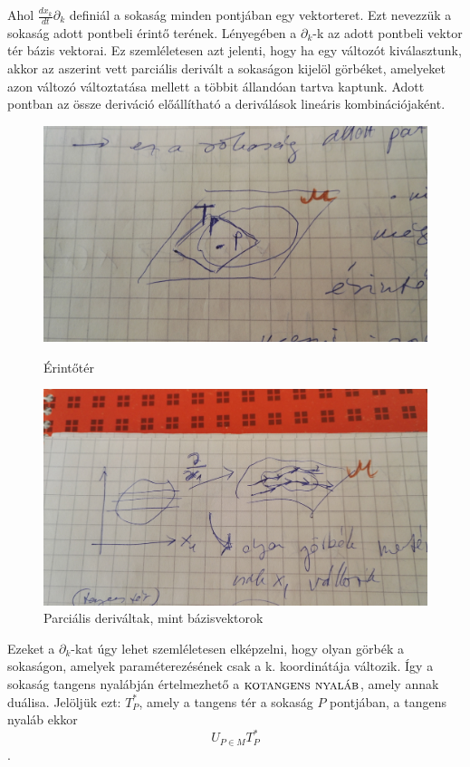 \documentclass[a4paper, 12pt]{article}
\begin{document}
\par Ahol $\frac{dx_{k}}{dt}\partial_{k}$ definiál a sokaság minden pontjában egy vektorteret. Ezt nevezzük a sokaság adott pontbeli érintő terének. Lényegében a $\partial_{k}$-k az adott pontbeli vektor tér bázis vektorai. Ez szemléletesen azt jelenti, hogy ha egy változót kiválasztunk, akkor az aszerint vett parciális derivált a sokaságon kijelöl görbéket, amelyeket azon változó változtatása mellett a többit állandóan tartva kaptunk. Adott pontban az össze deriváció előállítható a deriválások lineáris kombinációjaként.
\begin{figure}[h!]
\centering
\begin{minipage}{0.46\linewidth}
\centering
\includegraphics[width=0.9\linewidth]{erintoter.jpg}
\caption{Érintőtér}
\end{minipage}
\begin{minipage}{0.46\linewidth}
\centering
\includegraphics[width=0.9\linewidth]{derivacio.jpg}
\caption{Parciális deriváltak, mint bázisvektorok}
\end{minipage}
\end{figure}
\par Ezeket a $\partial_{k}$-kat úgy lehet szemléletesen elképzelni, hogy olyan görbék a sokaságon, amelyek paraméterezésének csak a k. koordinátája változik. Így a sokaság tangens nyalábján értelmezhető a $\textsc{kotangens nyaláb}$, amely annak duálisa. Jelöljük ezt: $T_{P}^{*}$, amely a tangens tér a sokaság $P$ pontjában, a tangens nyaláb ekkor \[U_{P\in M}^{}T^{*}_{P}\].
\end{document}
